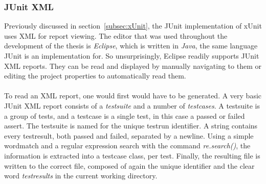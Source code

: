 \documentclass[11pt,british]{article}
\begin{document}
\subsubsection{JUnit XML}
Previously discussed in section~\ref{subsec:xUnit}, the JUnit implementation of xUnit uses \gls{XML} for report viewing. The editor that was used throughout the development of the thesis is \emph{Eclipse}, which is written in \emph{Java}, the same language JUnit is an implementation for. So unsurprisingly, Eclipse readily supports JUnit XML reports. They can be read and displayed by manually navigating to them or editing the project properties to automatically read them.\\
\\
To read an XML report, one would first would have to be generated. A very basic JUnit XML report consists of a \emph{testsuite} and a number of \emph{testcases}. A testsuite is a group of tests, and a testcase is a single test, in this case a passed or failed assert.
The testsuite is named for the unique testrun identifier. A string contains every testresult, both passed and failed, separated by a newline. Using a simple wordmatch and a regular expression search with the command \emph{re.search()}, the information is extracted into a testcase class, per test. Finally, the resulting file is written to the  correct file, composed of again the unique identifier and the clear word \emph{testresults} in the current working directory.\\
\end{document}
